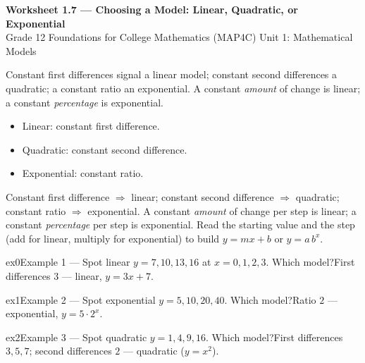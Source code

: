 \documentclass[11pt]{article}
\begin{document}
\begin{center}
{\LARGE\bfseries\color{titleblue}Worksheet 1.7 --- Choosing a Model: Linear, Quadratic, or Exponential}\\[2pt]
{\small Grade 12 Foundations for College Mathematics (MAP4C) \textperiodcentered{} Unit 1: Mathematical Models}
\end{center}

\begin{ideabox}
Constant first differences signal a linear model; constant second differences a quadratic; a constant ratio an exponential. A constant \emph{amount} of change is linear; a constant \emph{percentage} is exponential.
\begin{itemize}[leftmargin=*,itemsep=2pt]
  \item Linear: constant first difference.
  \item Quadratic: constant second difference.
  \item Exponential: constant ratio.
\end{itemize}
\end{ideabox}

\begin{learnbox}
Constant first difference $\Rightarrow$ linear; constant second difference $\Rightarrow$ quadratic; constant ratio $\Rightarrow$ exponential.
A constant \emph{amount} of change per step is linear; a constant \emph{percentage} per step is exponential.
Read the starting value and the step (add for linear, multiply for exponential) to build $y=mx+b$ or $y=a\,b^{x}$.
\end{learnbox}


\begin{example}{ex0}{Example 1 --- Spot linear}
$y=7,10,13,16$ at $x=0,1,2,3$. Which model?\soln First differences $3$ — linear, $y=3x+7$.
\end{example}

\begin{example}{ex1}{Example 2 --- Spot exponential}
$y=5,10,20,40$. Which model?\soln Ratio $2$ — exponential, $y=5\cdot2^{x}$.
\end{example}

\begin{example}{ex2}{Example 3 --- Spot quadratic}
$y=1,4,9,16$. Which model?\soln First differences $3,5,7$; second differences $2$ — quadratic ($y=x^2$).
\end{example}
\end{document}
